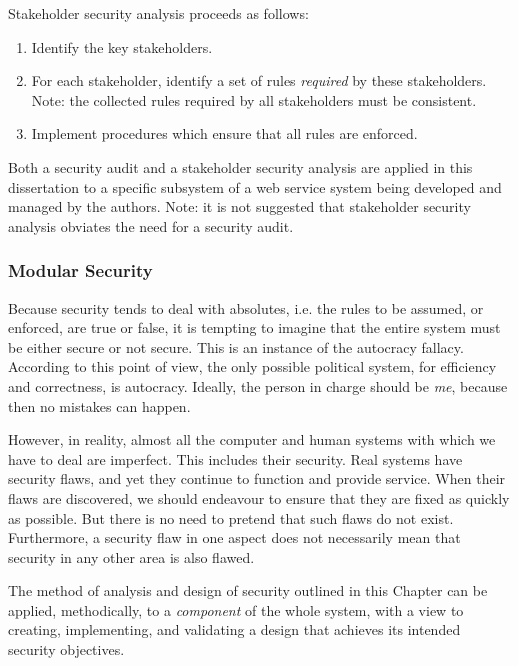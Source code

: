 Stakeholder security analysis proceeds as follows: 
\begin{enumerate}[1.]
\item Identify the key stakeholders.
\item For each stakeholder, identify a set of rules {\em required}
by these stakeholders. Note: the collected rules required
by all stakeholders must be consistent.
\item Implement procedures which ensure that all rules are enforced.
\end{enumerate}

Both a security audit and a stakeholder security analysis
are applied in this dissertation to a specific subsystem of a web
service system being developed and managed by the authors.
Note: it is not suggested that stakeholder security analysis obviates
the need for a security audit.



\subsubsection{Modular Security}

Because security tends to deal with absolutes, i.e. the rules to be assumed, or enforced, are true or false, it is tempting to imagine that the entire system must be either secure or not secure. This is an instance of the autocracy fallacy. According to this point of view, the only possible political system, for efficiency and correctness, is autocracy. Ideally, the person in charge should be {\em me}, because then no mistakes can happen.

However, in reality, almost all the computer and human systems with which we have to deal are imperfect. This includes their security. Real systems have security flaws, and yet they continue to function and provide service. When their flaws are discovered, we should endeavour to ensure that they are fixed as quickly as possible. But there is no need to pretend that such flaws do not exist. Furthermore, a security flaw in one aspect does not necessarily mean that security in any other area is also flawed.

The method of analysis and design of security outlined in this Chapter can be applied, methodically, to a {\em component} of the whole system, with a view to creating, implementing, and validating a design that achieves its intended security objectives.

